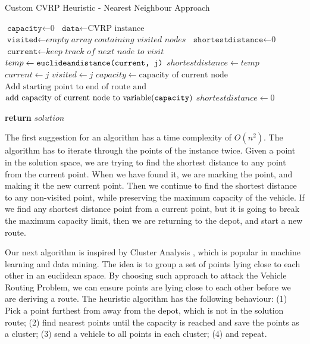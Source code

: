 \documentclass[12pt]{article}
\newcommand{\var}{\texttt}
\begin{document}
\begin{algorithm}
	\caption{Custom CVRP Heuristic - Nearest Neighbour Approach}\label{euclid}
	\begin{algorithmic}[1]
	\State $\var{capacity} \gets \text{0}$
	\State $\var{data} \gets \text{CVRP instance}$
	\State $\var{visited} \gets \textit{empty array containing visited nodes}$
	\State $\var{shortestdistance} \gets \textit{0}$
	\State $\var{current} \gets \textit{keep track of next node to visit}$
	\For{\texttt{$\var{i} \gets 0$ to $\text{length of data-1}$}}
		\For{\texttt{$\var{j} \gets 1$ to $\text{length of data}$}}
			\State $temp \gets \var{euclideandistance(\var{current}, \var{j})}$
					\State $shortestdistance \gets temp$
					\State $current \gets j$
					\State $visited \gets j$
					\newline{}
						\State $capacity \gets \text{capacity of current node}$					
					\Else
						\State $\text{Add starting point to end of route and}$
						\State $\text{add capacity of current node to variable(\var{capacity})}$
					\EndIf
				\EndIf
			\EndIf
		\EndFor
		\State $shortestdistance \gets 0$ 
	\EndFor

	\State \textbf{return} $solution$
	\EndFunction
	\end{algorithmic}
	\end{algorithm}

	The first suggestion for an algorithm has a time complexity of $O(n^2)$. The algorithm has to iterate through the points of the instance twice. 
	Given a point in the solution space, we are trying to find the shortest distance to any point from the current point. When we have found it, we are marking the point,
	and making it the new current point. Then we continue to find the shortest distance to any non-visited point, while preserving the maximum capacity of the vehicle. 
	If we find any shortest distance point from a current point, but it is going to break the maximum capacity limit, then we are returning to the depot, and start a new route.
	\newline

	Our next algorithm is inspired by Cluster Analysis \cite{website:cluster-analysis}, which is popular in machine learning and data mining. 
	The idea is to group a set of points lying close to each other in an euclidean space. 
	By choosing such approach to attack the Vehicle Routing Problem, we can ensure points are lying close to each other before we are deriving a route.
	\newline
	The heuristic algorithm has the following behaviour: (1) Pick a point furthest from away from the depot, which is not in the solution route; 
	(2) find nearest points until the capacity is reached and save the points as a cluster; (3) send a vehicle to all points in each cluster; (4) and repeat.
\end{document}
